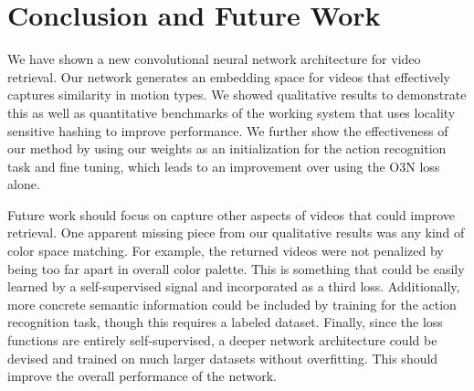 \section{Conclusion and Future Work}\label{sec:conclusion}

We have shown a new convolutional neural network architecture for video retrieval. Our network generates an embedding space for videos that effectively captures similarity in motion types. We showed qualitative results to demonstrate this as well as quantitative benchmarks of the working system that uses locality sensitive hashing to improve performance.  We further show the effectiveness of our method by using our weights as an initialization for the action recognition task and fine tuning, which leads to an improvement over using the O3N loss alone.

Future work should focus on capture other aspects of videos that could improve retrieval. One apparent missing piece from our qualitative results was any kind of color space matching. For example, the returned videos were not penalized by being too far apart in overall color palette. This is something that could be easily learned by a self-supervised signal and incorporated as a third loss. Additionally, more concrete semantic information could be included by training for the action recognition task, though this requires a labeled dataset. Finally, since the loss functions are entirely self-supervised, a deeper network architecture could be devised and trained on much larger datasets without overfitting. This should improve the overall performance of the network.
